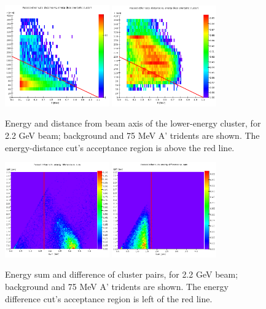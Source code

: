 \begin{figure}[ht]
	\includegraphics[width=0.4\textwidth]{performance/trigger/energy-distance_22}
	\includegraphics[width=0.4\textwidth]{performance/trigger/energy-distance_22_075mev}
	\caption{\small{Energy and distance from beam axis of the lower-energy cluster, for 2.2 GeV beam; background and 75 MeV A' tridents are shown. The energy-distance cut's acceptance region is above the red line.}}
	\label{fig:energy-distance}
\end{figure}

\begin{figure}[ht]
	\includegraphics[width=0.4\textwidth]{performance/trigger/ediff_22}
	\includegraphics[width=0.4\textwidth]{performance/trigger/ediff_22_075mev}
	\caption{\small{Energy sum and difference of cluster pairs, for 2.2 GeV beam; background and 75 MeV A' tridents are shown. The energy difference cut's acceptance region is left of the red line.}}
	\label{fig:ediff}
\end{figure}

